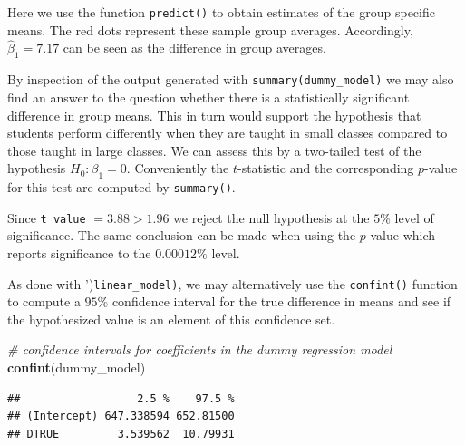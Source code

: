\documentclass[]{book}
\newenvironment{Shaded}{\begin{snugshade}}{\end{snugshade}}
\newcommand{\KeywordTok}[1]{\textcolor[rgb]{0.13,0.29,0.53}{\textbf{#1}}}
\newcommand{\DataTypeTok}[1]{\textcolor[rgb]{0.13,0.29,0.53}{#1}}
\newcommand{\DecValTok}[1]{\textcolor[rgb]{0.00,0.00,0.81}{#1}}
\newcommand{\StringTok}[1]{\textcolor[rgb]{0.31,0.60,0.02}{#1}}
\newcommand{\CommentTok}[1]{\textcolor[rgb]{0.56,0.35,0.01}{\textit{#1}}}
\newcommand{\OperatorTok}[1]{\textcolor[rgb]{0.81,0.36,0.00}{\textbf{#1}}}
\newcommand{\NormalTok}[1]{#1}
\theoremstyle{definition}
\theoremstyle{definition}
\theoremstyle{definition}
\theoremstyle{remark}
\begin{document}
\begin{Shaded}
\end{Shaded}

Here we use the function \texttt{predict()} to obtain estimates of the
group specific means. The red dots represent these sample group
averages. Accordingly, \(\hat{\beta}_1 = 7.17\) can be seen as the
difference in group averages.

By inspection of the output generated with
\texttt{summary(dummy\_model)} we may also find an answer to the
question whether there is a statistically significant difference in
group means. This in turn would support the hypothesis that students
perform differently when they are taught in small classes compared to
those taught in large classes. We can assess this by a two-tailed test
of the hypothesis \(H_0: \beta_1 = 0\). Conveniently the \(t\)-statistic
and the corresponding \(p\)-value for this test are computed by
\texttt{summary()}.

Since \texttt{t value} \(= 3.88 > 1.96\) we reject the null hypothesis
at the \(5\%\) level of significance. The same conclusion can be made
when using the \(p\)-value which reports significance to the
\(0.00012\%\) level.

As done with ')\texttt{linear\_model\textquotesingle{})}, we may
alternatively use the \texttt{confint()} function to compute a \(95\%\)
confidence interval for the true difference in means and see if the
hypothesized value is an element of this confidence set.

\begin{Shaded}
\begin{Highlighting}[]
\CommentTok{# confidence intervals for coefficients in the dummy regression model}
\KeywordTok{confint}\NormalTok{(dummy_model)}
\end{Highlighting}
\end{Shaded}

\begin{verbatim}
##                  2.5 %    97.5 %
## (Intercept) 647.338594 652.81500
## DTRUE         3.539562  10.79931
\end{verbatim}
\end{document}
